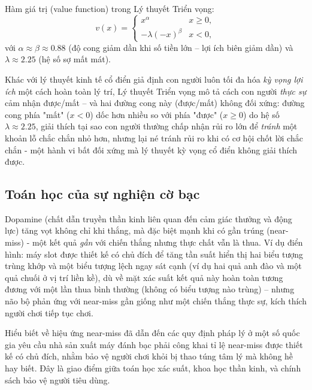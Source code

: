 \documentclass[12pt,a4paper]{article}
\theoremstyle{coloredthm}
\theoremstyle{coloreddef}
\theoremstyle{remark}
\begin{document}
Hàm giá trị (value function) trong Lý thuyết Triển vọng:
\[
v(x) = \begin{cases}
x^\alpha & x \ge 0, \\
-\lambda (-x)^\beta & x < 0,
\end{cases}
\]
với $\alpha \approx \beta \approx 0.88$ (độ cong giảm dần khi số tiền lớn -- lợi ích biên giảm dần) và $\lambda \approx 2.25$ (hệ số sợ mất mát).

\begin{giaithich}
Khác với lý thuyết kinh tế cổ điển giả định con người luôn tối đa hóa \emph{kỳ vọng lợi ích} một cách hoàn toàn lý trí, Lý thuyết Triển vọng mô tả cách con người \emph{thực sự} cảm nhận được/mất -- và hai đường cong này (được/mất) không đối xứng: đường cong phía "mất" ($x<0$) dốc hơn nhiều so với phía "được" ($x \ge 0$) do hệ số $\lambda \approx 2.25$, giải thích tại sao con người thường chấp nhận rủi ro lớn để \emph{tránh} một khoản lỗ chắc chắn nhỏ hơn, nhưng lại né tránh rủi ro khi có cơ hội chốt lời chắc chắn - một hành vi bất đối xứng mà lý thuyết kỳ vọng cổ điển không giải thích được.
\end{giaithich}

\subsection{Toán học của sự nghiện cờ bạc}

Dopamine (chất dẫn truyền thần kinh liên quan đến cảm giác thưởng và động lực) tăng vọt không chỉ khi thắng, mà đặc biệt mạnh khi có gần trúng (near-miss) - một kết quả \emph{gần} với chiến thắng nhưng thực chất vẫn là thua. Ví dụ điển hình: máy slot được thiết kế có chủ đích để tăng tần suất hiển thị hai biểu tượng trùng khớp và một biểu tượng lệch ngay sát cạnh (ví dụ hai quả anh đào và một quả chuối ở vị trí liền kề), dù về mặt xác suất kết quả này hoàn toàn tương đương với một lần thua bình thường (không có biểu tượng nào trùng) -- nhưng não bộ phản ứng với near-miss gần giống như một chiến thắng thực sự, kích thích người chơi tiếp tục chơi.

\begin{ungdung}
Hiểu biết về hiệu ứng near-miss đã dẫn đến các quy định pháp lý ở một số quốc gia yêu cầu nhà sản xuất máy đánh bạc phải công khai tỉ lệ near-miss được thiết kế có chủ đích, nhằm bảo vệ người chơi khỏi bị thao túng tâm lý mà không hề hay biết. Đây là giao điểm giữa toán học xác suất, khoa học thần kinh, và chính sách bảo vệ người tiêu dùng.
\end{ungdung}
\end{document}
